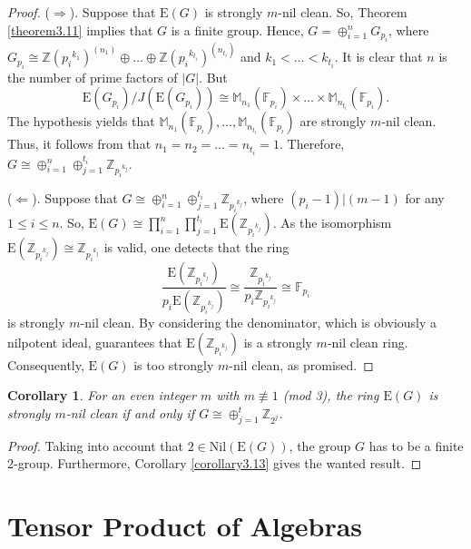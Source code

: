 \documentclass[12pt]{amsart}
\newtheorem{cor}[thm]{Corollary}
\theoremstyle{definition}
\theoremstyle{remark}
\numberwithin{equation}{section}
\begin{document}
\begin{proof} ($\Rightarrow$). Suppose that $\mathrm{E}(G)$ is strongly $m$-nil clean. So, Theorem \ref{theorem3.11} implies that $G$ is a finite group. Hence, $G=\oplus_{i=1}^{n} G_{p_i}$, where $G_{p_i} \cong \mathbb{Z}({p_i}^{k_1})^{(n_1)}\oplus\ldots \oplus \mathbb{Z}({p_i}^{k_{t_i}})^{(n_{t_i})}$ and $k_1<\ldots<k_{t_i}$. It is clear that $n$ is the number of prime factors of $|G|$. But $$\mathrm{E}(G_{p_i})/J(\mathrm{E}(G_{p_i}))\cong \mathbb{M}_{n_1}(\mathbb{F}_{p_i})\times\ldots \times  \mathbb{M}_{n_{t_i}}(\mathbb{F}_{p_i}).$$
The hypothesis yields that $\mathbb{M}_{n_1}(\mathbb{F}_{p_i}), \ldots ,  \mathbb{M}_{n_{t_i}}(\mathbb{F}_{p_i})$ are strongly $m$-nil clean. Thus, it follows from \cite[corollary 19]{AT} that $n_1=n_2= \ldots =n_{t_i}=1$. Therefore, $G \cong \oplus_{i=1}^n \oplus_{j=1}^{t_i} \mathbb{Z}_{{p_i}^{k_j}}$.

($\Leftarrow$). Suppose that $G \cong \oplus_{i=1}^n \oplus_{j=1}^{t_i} \mathbb{Z}_{{p_i}^{k_j}}$, where $(p_i-1)|(m-1)$ for any $1 \leq i \leq n$. So, $\mathrm{E}(G) \cong \prod_{i=1}^n \prod_{j=1}^{t_i} \mathrm{E}(\mathbb{Z}_{{p_i}^{k_j}})$. As the isomorphism $\mathrm{E}(\mathbb{Z}_{{p_i}^{k_j}}) \cong \mathbb{Z}_{{p_i}^{k_j}}$ is valid, one detects that the ring $$\frac{\mathrm{E}(\mathbb{Z}_{{p_i}^{k_j}})}{p_i\mathrm{E}(\mathbb{Z}_{{p_i}^{k_j}})} \cong \frac{\mathbb{Z}_{{p_i}^{k_j}}}{p_i\mathbb{Z}_{{p_i}^{k_j}}} \cong \mathbb{F}_{p_i}$$
is strongly $m$-nil clean. By considering the denominator, which is obviously a nilpotent ideal, \cite[Theorem 1.11]{BMA} guarantees that $\mathrm{E}(\mathbb{Z}_{{p_i}^{k_j}})$ is a strongly $m$-nil clean ring. Consequently, $\mathrm{E}(G)$ is too strongly $m$-nil clean, as promised.
\end{proof}

\begin{cor}
For an even integer $m$ with $m \not\equiv 1$ (mod 3), the ring $\mathrm{E}(G)$ is strongly $m$-nil clean if and only if $G\cong \oplus_{j=1}^t \mathbb{Z}_{2^j}$.
\end{cor}

\begin{proof}
Taking into account that $2 \in \mathrm{Nil}(\mathrm{E}(G))$, the group $G$ has to be a finite $2$-group. Furthermore, Corollary \ref{corollary3.13} gives the wanted result.
\end{proof}


\section{Tensor Product of Algebras}\label{SectionTensorProductOfAlgebra}
\end{document}
